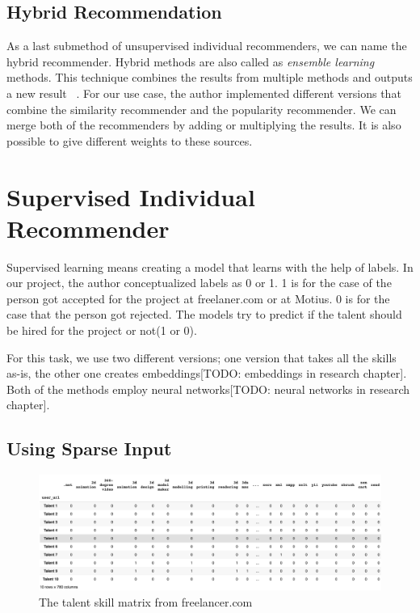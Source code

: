 \subsection{Hybrid Recommendation}

As a last submethod of unsupervised individual recommenders, we can name the hybrid recommender. Hybrid methods are also called as \textit{ensemble learning} methods. This technique combines the results from multiple methods and outputs a new result ~\parencite{beliakov2015aggregation}. For our use case, the author implemented different versions that combine the similarity recommender and the popularity  recommender. We can merge both of the recommenders by adding or multiplying the results. It is also possible to give different weights to these sources.


\section{Supervised Individual Recommender}

Supervised learning means creating a model that learns with the help of labels. In our project, the author conceptualized labels as 0 or 1. 1 is for the case of the person got accepted for the project at freelaner.com or at Motius. 0 is for the case that the person got rejected. The models try to predict if the talent should be hired for the project or not(1 or 0).

For this task, we use two different versions; one version that takes all the skills as-is, the other one creates embeddings[TODO: embeddings in research chapter]. Both of the methods employ neural networks[TODO: neural networks in research chapter].


\subsection{Using Sparse Input}

\begin{figure}[h]
	\centering
	\includegraphics[width=\textwidth]{figures/FreelancerTalentSkillsMatrix.png}
	\caption{The talent skill matrix from freelancer.com}
	\label{fig:freelancer-talent-matrix}
\end{figure}

